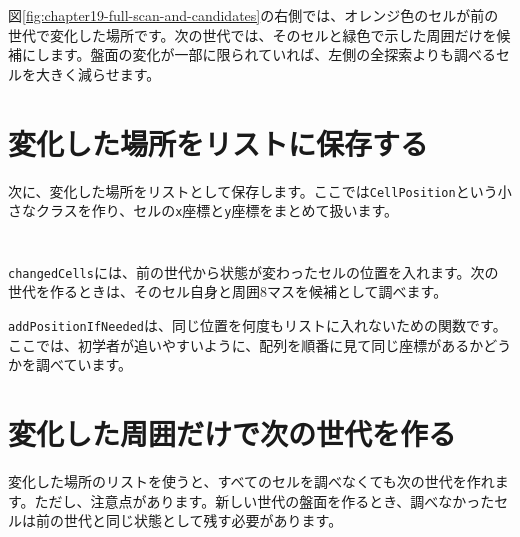図\ref{fig:chapter19-full-scan-and-candidates}の右側では、オレンジ色のセルが前の世代で変化した場所です。次の世代では、そのセルと緑色で示した周囲だけを候補にします。盤面の変化が一部に限られていれば、左側の全探索よりも調べるセルを大きく減らせます。

\section{変化した場所をリストに保存する}

次に、変化した場所をリストとして保存します。ここでは\texttt{CellPosition}という小さなクラスを作り、セルの\texttt{x}座標と\texttt{y}座標をまとめて扱います。

\begin{listing}[htbp]
\inputminted[firstline=1,lastline=46]{ts}{typescript-p5/listings/chapter18/life-game-changed-cells.ts}
\caption{変化したセルの位置を記録する（\texttt{chapter18/life-game-changed-cells.ts}）}
\label{lst:chapter18-changed-cells-position}
\end{listing}

\begin{listing}[htbp]
\inputminted[firstline=60,lastline=103]{ts}{typescript-p5/listings/chapter18/life-game-changed-cells.ts}
\caption{変化したセルとその周囲を候補に入れる（\texttt{chapter18/life-game-changed-cells.ts}）}
\label{lst:chapter18-changed-cells-candidates}
\end{listing}

\texttt{changedCells}には、前の世代から状態が変わったセルの位置を入れます。次の世代を作るときは、そのセル自身と周囲8マスを候補として調べます。

\texttt{addPositionIfNeeded}は、同じ位置を何度もリストに入れないための関数です。ここでは、初学者が追いやすいように、配列を順番に見て同じ座標があるかどうかを調べています。

\section{変化した周囲だけで次の世代を作る}

変化した場所のリストを使うと、すべてのセルを調べなくても次の世代を作れます。ただし、注意点があります。新しい世代の盤面を作るとき、調べなかったセルは前の世代と同じ状態として残す必要があります。

\begin{listing}[htbp]
\inputminted[firstline=1,lastline=36]{ts}{typescript-p5/listings/chapter18/life-game-optimized.ts}
\caption{差分更新版で使う位置と結果のクラス（\texttt{chapter18/life-game-optimized.ts}）}
\label{lst:chapter18-optimized-classes}
\end{listing}

